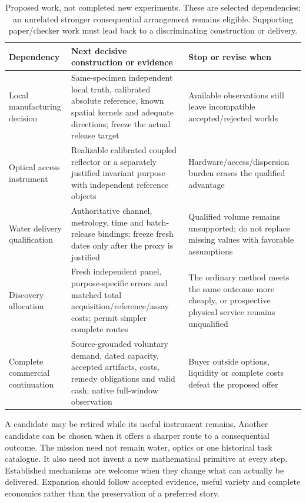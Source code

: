 \documentclass[11pt,letterpaper]{article}
\begin{document}
\begin{table}[htbp]\centering\small
\begin{tabularx}{\linewidth}{@{}P{2.55cm}YY@{}}\toprule
Dependency & Next decisive construction or evidence & Stop or revise when\\\midrule
Local manufacturing decision & Same-specimen independent local truth, calibrated absolute reference, known spatial kernels and adequate directions; freeze the actual release target & Available observations still leave incompatible accepted/rejected worlds\\
Optical access instrument & Realizable calibrated coupled reflector or a separately justified invariant purpose with independent reference objects & Hardware/access/dispersion burden erases the qualified advantage\\
Water delivery qualification & Authoritative channel, metrology, time and batch-release bindings; freeze fresh dates only after the proxy is justified & Qualified volume remains unsupported; do not replace missing values with favorable assumptions\\
Discovery allocation & Fresh independent panel, purpose-specific errors and matched total acquisition/reference/assay costs; permit simpler complete routes & The ordinary method meets the same outcome more cheaply, or prospective physical service remains unqualified\\
Complete commercial continuation & Source-grounded voluntary demand, dated capacity, accepted artifacts, costs, remedy obligations and valid cash; native full-window observation & Buyer outside options, liquidity or complete costs defeat the proposed offer\\\bottomrule
\end{tabularx}
\caption{Proposed work, not completed new experiments. These are selected dependencies; an unrelated stronger consequential arrangement remains eligible. Supporting paper/checker work must lead back to a discriminating construction or delivery.}\label{tab:next}
\end{table}

A candidate may be retired while its useful instrument remains. Another candidate can be chosen when it offers a sharper route to a consequential outcome. The mission need not remain water, optics or one historical task catalogue. It also need not invent a new mathematical primitive at every step. Established mechanisms are welcome when they change what can actually be delivered. Expansion should follow accepted evidence, useful variety and complete economics rather than the preservation of a preferred story.
\end{document}
